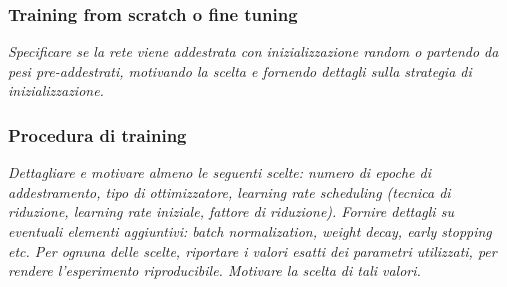 \subsubsection{Training from scratch o fine tuning}
\emph{Specificare se la rete viene addestrata con inizializzazione random o partendo da pesi pre-addestrati, motivando la scelta e fornendo dettagli sulla strategia di inizializzazione.}

\subsubsection{Procedura di training}
\emph{Dettagliare e motivare almeno le seguenti scelte: numero di epoche di addestramento, tipo di ottimizzatore, learning rate scheduling (tecnica di riduzione, learning rate iniziale, fattore di riduzione). Fornire dettagli su eventuali elementi aggiuntivi: batch normalization, weight decay, early stopping etc. Per ognuna delle scelte, riportare i valori esatti dei parametri utilizzati, per rendere l’esperimento riproducibile. Motivare la scelta di tali valori.}